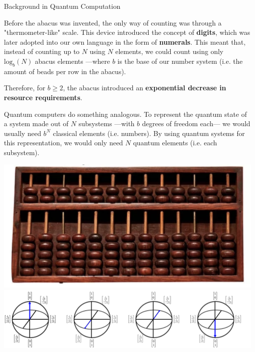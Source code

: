 \documentclass[9pt, handout, aspectratio=169]{beamer}	%
\begin{document}
\begin{frame}{Background in Quantum Computation}

	Before the abacus was invented, the only way of counting was through a "thermometer-like" scale. This device introduced the concept of \textbf{digits}, which was later adopted into our own language in the form of \textbf{numerals}. This meant that, instead of counting up to $N$ using $N$ elements, we could count using only $\text{log}_b (N)$ abacus elements ---where $b$ is the base of our number system (i.e. the amount of beads per row in the abacus).

		\begin{multicols}{2}

		 	Therefore, for $b\geq2$, the abacus introduced an \textbf{exponential decrease in resource requirements}.

			\medskip

			Quantum computers do something analogous. To represent the quantum state of a system made out of $N$ subsystems ---with $b$ degrees of freedom each--- we would usually need $b^N$ classical elements (i.e. numbers). By using quantum systems for this representation, we would only need $N$ quantum elements (i.e. each subsystem).

			\columnbreak

			\begin{center}
				\includegraphics[width=.30\paperwidth]{Figures/abacus} \\
				\vspace{10pt}
				\includegraphics[width=.34\paperwidth]{Figures/qubits}
			\end{center}

		\end{multicols}

\end{frame}
\end{document}
